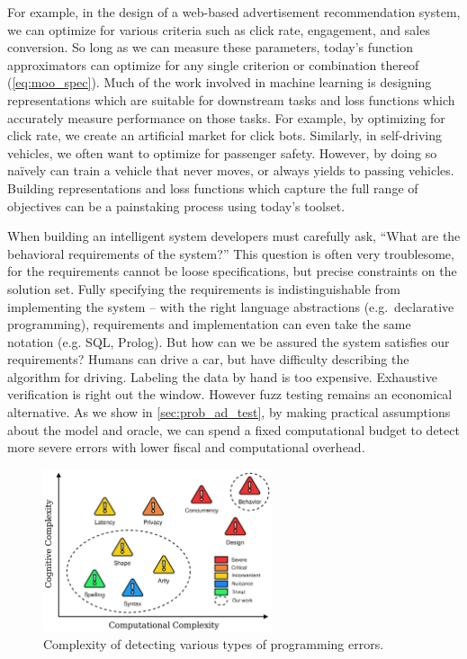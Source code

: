 For example, in the design of a web-based advertisement recommendation system, we can optimize for various criteria such as click rate, engagement, and sales conversion. So long as we can measure these parameters, today's function approximators can optimize for any single criterion or combination thereof (\autoref{eq:moo_spec}). Much of the work involved in machine learning is designing representations which are suitable for downstream tasks and loss functions which accurately measure performance on those tasks. For example, by optimizing for click rate, we create an artificial market for click bots. Similarly, in self-driving vehicles, we often want to optimize for passenger safety. However, by doing so na\"ively can train a vehicle that never moves, or always yields to passing vehicles. Building representations and loss functions which capture the full range of objectives can be a painstaking process using today's toolset.

When building an intelligent system developers must carefully ask, ``What are the behavioral requirements of the system?'' This question is often very troublesome, for the requirements cannot be loose specifications, but precise constraints on the solution set. Fully specifying the requirements is indistinguishable from implementing the system -- with the right language abstractions (e.g.\ declarative programming), requirements and implementation can even take the same notation (e.g. SQL, Prolog). But how can we be assured the system satisfies our requirements? Humans can drive a car, but have difficulty describing the algorithm for driving. Labeling the data by hand is too expensive. Exhaustive verification is right out the window. However fuzz testing remains an economical alternative. As we show in \autoref{sec:prob_ad_test}, by making practical assumptions about the model and oracle, we can spend a fixed computational budget to detect more severe errors with lower fiscal and computational overhead.

\begin{figure}
    \centering
    \includegraphics[width=0.60\textwidth]{../figures/verification_complexity.png}
    \caption{Complexity of detecting various types of programming errors.}
    \label{fig:verification_complexity}
\end{figure}

